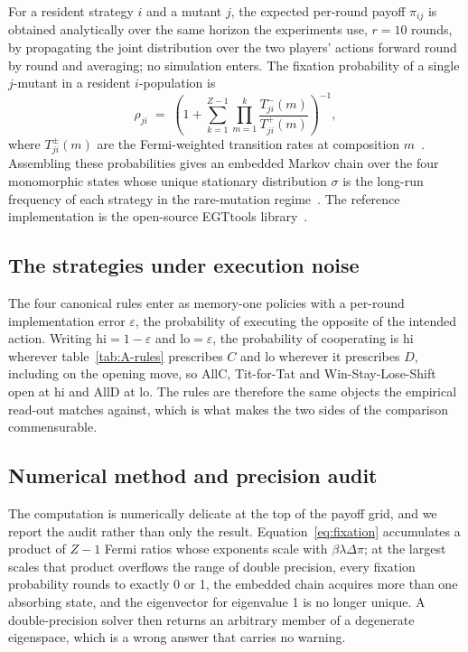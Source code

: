 \documentclass[openacc]{rsproca_new}
\newcommand{\lam}{\lambda}
\begin{document}
For a resident strategy $i$ and a mutant $j$, the expected per-round payoff
$\pi_{ij}$ is obtained analytically over the same horizon the experiments use,
$r = 10$ rounds, by propagating the joint distribution over the two players'
actions forward round by round and averaging; no simulation enters. The
fixation probability of a single $j$-mutant in a resident $i$-population is
\begin{equation}
\rho_{ji} \;=\; \left(1 + \sum_{k=1}^{Z-1}\prod_{m=1}^{k}
   \frac{T^{-}_{ji}(m)}{T^{+}_{ji}(m)}\right)^{-1},
\label{eq:fixation}
\end{equation}
where $T^{\pm}_{ji}(m)$ are the Fermi-weighted transition rates at composition
$m$~\cite{szabo1998evolutionary}. Assembling these probabilities gives an
embedded Markov chain over the four monomorphic states whose unique stationary
distribution $\sigma$ is the long-run frequency of each strategy in the
rare-mutation regime~\cite{sigmund:2010bo}. The reference implementation is
the open-source EGTtools library~\cite{domingos2023egttools}.

\subsection{The strategies under execution noise}\label{appendix:egt_strategies}

The four canonical rules enter as memory-one policies with a per-round
implementation error $\varepsilon$, the probability of executing the opposite
of the intended action. Writing $\mathrm{hi} = 1 - \varepsilon$ and
$\mathrm{lo} = \varepsilon$, the probability of cooperating is $\mathrm{hi}$
wherever table~\ref{tab:A-rules} prescribes $C$ and $\mathrm{lo}$ wherever it
prescribes $D$, including on the opening move, so AllC, Tit-for-Tat and
Win-Stay-Lose-Shift open at $\mathrm{hi}$ and AllD at $\mathrm{lo}$. The rules
are therefore the same objects the empirical read-out matches against, which is
what makes the two sides of the comparison commensurable.

\subsection{Numerical method and precision audit}\label{appendix:egt_numerics}

The computation is numerically delicate at the top of the payoff grid, and we
report the audit rather than only the result. Equation~\eqref{eq:fixation}
accumulates a product of $Z-1$ Fermi ratios whose exponents scale with
$\beta \lam \Delta\pi$; at the largest scales that product overflows the range
of double precision, every fixation probability rounds to exactly 0 or 1, the
embedded chain acquires more than one absorbing state, and the eigenvector for
eigenvalue 1 is no longer unique. A double-precision solver then returns an
arbitrary member of a degenerate eigenspace, which is a wrong answer that
carries no warning.
\end{document}
